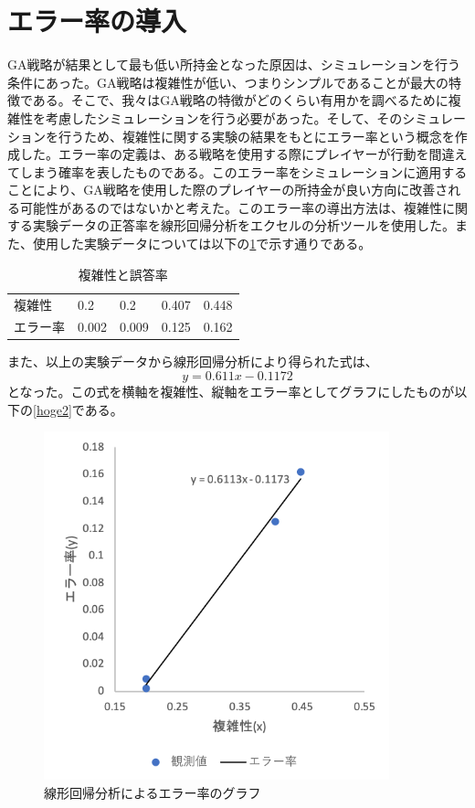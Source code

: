 \section{エラー率の導入}
GA戦略が結果として最も低い所持金となった原因は、シミュレーションを行う条件にあった。GA戦略は複雑性が低い、つまりシンプルであることが最大の特徴である。そこで、我々はGA戦略の特徴がどのくらい有用かを調べるために複雑性を考慮したシミュレーションを行う必要があった。そして、そのシミュレーションを行うため、複雑性に関する実験の結果をもとにエラー率という概念を作成した。エラー率の定義は、ある戦略を使用する際にプレイヤーが行動を間違えてしまう確率を表したものである。このエラー率をシミュレーションに適用することにより、GA戦略を使用した際のプレイヤーの所持金が良い方向に改善される可能性があるのではないかと考えた。このエラー率の導出方法は、複雑性に関する実験データの正答率を線形回帰分析をエクセルの分析ツールを使用した。また、使用した実験データについては以下の\ref{hoge}で示す通りである。
\begin{table}[H]
\begin{tabular}{lllll}
複雑性&0.2&0.2&0.407&0.448 \\
エラー率&0.002&0.009&0.125&0.162 \\ 
\end{tabular}
\caption{複雑性と誤答率}
\label{hoge}
\end{table}
また、以上の実験データから線形回帰分析により得られた式は、
\begin{equation}
y=0.611x - 0.1172
\end{equation}
となった。この式を横軸を複雑性、縦軸をエラー率としてグラフにしたものが以下の\ref{hoge2}である。
\begin{figure}[H]
\begin{center}
\includegraphics[width=10cm]{figure/error_rate.png}
\caption{線形回帰分析によるエラー率のグラフ}
\end{center}
\end{figure}
